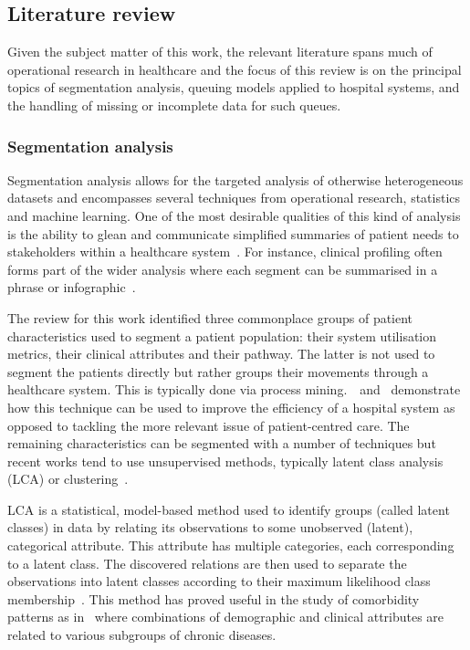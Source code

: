 \subsection{Literature review}\label{subsec:review}

Given the subject matter of this work, the relevant literature spans much of
operational research in healthcare and the focus of this review is on the
principal topics of segmentation analysis, queuing models applied to hospital
systems, and the handling of missing or incomplete data for such queues.

\subsubsection{Segmentation analysis}

Segmentation analysis allows for the targeted analysis of otherwise
heterogeneous datasets and encompasses several techniques from operational
research, statistics and machine learning. One of the most desirable qualities
of this kind of analysis is the ability to glean and communicate simplified
summaries of patient needs to stakeholders within a healthcare
system~\cite{Vuik2016b, Yoon2020}. For instance, clinical profiling often
forms part of the wider analysis where each segment can be summarised in a
phrase or infographic~\cite{Vuik2016a, Yan2019}.

The review for this work identified three commonplace groups of patient
characteristics used to segment a patient population: their system
utilisation metrics, their clinical attributes and their pathway. The latter
is not used to segment the patients directly but rather groups their movements
through a healthcare system. This is typically done via process
mining.~\cite{Arnolds2018}~and~\cite{Delias2015} demonstrate how this technique
can be used to improve the efficiency of a hospital system as opposed to
tackling the more relevant issue of patient-centred care. The remaining
characteristics can be segmented with a number of techniques but recent works
tend to use unsupervised methods, typically latent class analysis (LCA) or
clustering~\cite{Yan2018}.

LCA is a statistical, model-based method used to identify groups (called latent
classes) in data by relating its observations to some unobserved (latent),
categorical attribute. This attribute has multiple categories, each
corresponding to a latent class. The discovered relations are then used to
separate the observations into latent classes according to their maximum
likelihood class membership~\cite{Hagenaars2002,Lazarsfeld1968}. This method has
proved useful in the study of comorbidity patterns as
in~\cite{Larsen2017,Kuwornu2014} where combinations of demographic and clinical
attributes are related to various subgroups of chronic diseases.

